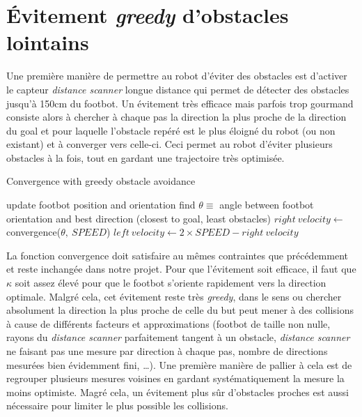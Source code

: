 \section{Évitement \emph{greedy} d'obstacles lointains}

Une première manière de permettre au robot d'éviter des obstacles est d'activer le capteur \emph{distance scanner} longue distance qui permet de détecter des obstacles jusqu'à 150cm du footbot. Un évitement très efficace mais parfois trop gourmand consiste alors à chercher à chaque pas la direction la plus proche de la direction du goal et pour laquelle l'obstacle repéré est le plus éloigné du robot (ou non existant) et à converger vers celle-ci. Ceci permet au robot d'éviter plusieurs obstacles à la fois, tout en gardant une trajectoire très optimisée.

\begin{algorithm}
\caption{Convergence with greedy obstacle avoidance}
\label{greedyConvergence}
\begin{algorithmic}
    \STATE update footbot position and orientation
    \STATE find \( \theta \equiv\) angle between footbot orientation and best direction (closest to goal, least obstacles)
    \STATE \( right\:velocity \gets\) convergence(\(\theta,\:SPEED\))
    \STATE \( left\:velocity \gets 2 \times SPEED-right\:velocity\) 
  \ENDWHILE
\end{algorithmic}
\end{algorithm}

La fonction convergence doit satisfaire au mêmes contraintes que précédemment et reste inchangée dans notre projet. Pour que l'évitement soit efficace, il faut que $\kappa$ soit assez élevé pour que le footbot s'oriente rapidement vers la direction optimale. Malgré cela, cet évitement reste très \emph{greedy}, dans le sens ou chercher absolument la direction la plus proche de celle du but peut mener à des collisions à cause de différents facteurs et approximations (footbot de taille non nulle, rayons du \emph{distance scanner} parfaitement tangent à un obstacle, \emph{distance scanner} ne faisant pas une mesure par direction à chaque pas, nombre de directions mesurées bien évidemment fini, \ldots). Une première manière de pallier à cela est de regrouper plusieurs mesures voisines en gardant systématiquement la mesure la moins optimiste. Magré cela, un évitement plus sûr d'obstacles proches est aussi nécessaire pour limiter le plus possible les collisions.

